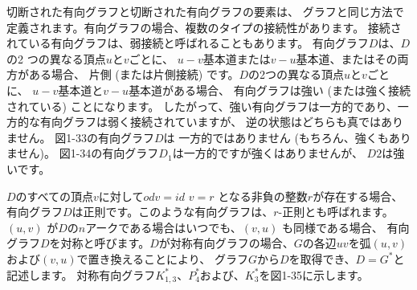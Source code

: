 
切断された有向グラフと切断された有向グラフの要素は、
グラフと同じ方法で定義されます。有向グラフの場合、複数のタイプの接続性があります。
接続されている有向グラフは、弱接続と呼ばれることもあります。
有向グラフ$D$は、$D$の2 つの異なる頂点$u$と$v$ごとに、
$u-v$基本道または$v-u$基本道、またはその両方がある場合、
片側 (または片側接続) です。$D$の2つの異なる頂点$u$と$v$ごとに、
$u-v$基本道と$v-u$基本道がある場合、
有向グラフは強い (または強く接続されている) ことになります。
したがって、強い有向グラフは一方的であり、一方的な有向グラフは弱く接続されていますが、
逆の状態はどちらも真ではありません。 図1-33の有向グラフ$D$は
一方的ではありません (もちろん、強くもありません)。 図1-34の有向グラフ$D_1$は一方的ですが強くはありませんが、
$D2$は強いです。

$D$のすべての頂点$v$に対して$odv = id$ $v = r$ となる非負の整数$r$が存在する場合、
有向グラフ$D$は正則です。このような有向グラフは、$r$-正則とも呼ばれます。
$(u, v)$ が$D$の$n$アークである場合はいつでも、$(v, u)$ も同様である場合、
有向グラフ$D$を対称と呼びます。$D$が対称有向グラフの場合、$G$の各辺$uv$を弧$(u, v)$および$(v, u)$で置き換えることにより、
グラフ$G$から$D$を取得でき、$D = G^\ast$と記述します。 対称有向グラフ$K^\ast_{1,3}、P_4^\ast$および、$K_3^\ast$を図1-35に示します。

